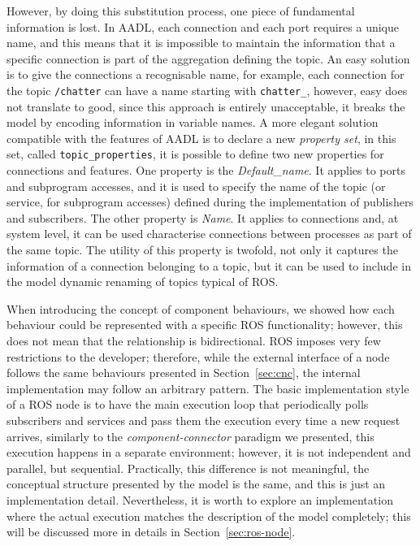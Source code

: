 However, by doing this substitution process, one piece of fundamental information is lost. In AADL, each connection and each port requires a unique name, and this means that it is impossible to maintain the information that a specific connection is part of the aggregation defining the topic. An easy solution is to give the connections a recognisable name, for example, each connection for the topic \texttt{/chatter} can have a name starting with \texttt{chatter\_}, however, easy does not translate to good, since this approach is entirely unacceptable, it breaks the model by encoding information in variable names. A more elegant solution compatible with the features of AADL is to declare a new \textit{property set}, in this set, called \texttt{topic\_properties}, it is possible to define two new properties for connections and features. One property is the \textit{Default\_name}. It applies to ports and subprogram accesses, and it is used to specify the name of the topic (or service, for subprogram accesses) defined during the implementation of publishers and subscribers. The other property is \textit{Name}. It applies to connections and, at system level, it can be used characterise connections between processes as part of the same topic. The utility of this property is twofold, not only it captures the information of a connection belonging to a topic, but it can be used to include in the model dynamic renaming of topics typical of ROS.

When introducing the concept of component behaviours, we showed how each behaviour could be represented with a specific ROS functionality; however, this does not mean that the relationship is bidirectional. ROS imposes very few restrictions to the developer; therefore, while the external interface of a node follows the same behaviours presented in Section~\ref{sec:cnc}, the internal implementation may follow an arbitrary pattern. The basic implementation style of a ROS node is to have the main execution loop that periodically polls subscribers and services and pass them the execution every time a new request arrives, similarly to the \textit{component-connector} paradigm we presented, this execution happens in a separate environment; however, it is not independent and parallel, but sequential. Practically, this difference is not meaningful, the conceptual structure presented by the model is the same, and this is just an implementation detail. Nevertheless, it is worth to explore an implementation where the actual execution matches the description of the model completely; this will be discussed more in details in Section~\ref{sec:ros-node}.

